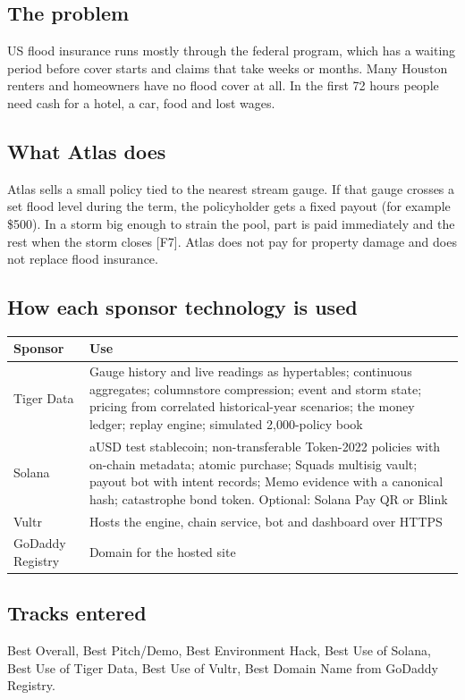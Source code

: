 \documentclass[11pt]{article}
\begin{document}
\subsection{The problem}
US flood insurance runs mostly through the federal program, which has a waiting period before cover starts and claims that take weeks or months. Many Houston renters and homeowners have no flood cover at all. In the first 72 hours people need cash for a hotel, a car, food and lost wages.

\subsection{What Atlas does}
Atlas sells a small policy tied to the nearest stream gauge. If that gauge crosses a set flood level during the term, the policyholder gets a fixed payout (for example \$500). In a storm big enough to strain the pool, part is paid immediately and the rest when the storm closes [F7]. Atlas does not pay for property damage and does not replace flood insurance.

\subsection{How each sponsor technology is used}
{\small
\begin{xltabular}{\linewidth}{@{}L{2.8cm} Y@{}}
\toprule
Sponsor & Use \\
\midrule
Tiger Data & Gauge history and live readings as hypertables; continuous aggregates; columnstore compression; event and storm state; pricing from correlated historical-year scenarios; the money ledger; replay engine; simulated 2,000-policy book \\
Solana & aUSD test stablecoin; non-transferable Token-2022 policies with on-chain metadata; atomic purchase; Squads multisig vault; payout bot with intent records; Memo evidence with a canonical hash; catastrophe bond token. Optional: Solana Pay QR or Blink \\
Vultr & Hosts the engine, chain service, bot and dashboard over HTTPS \\
GoDaddy Registry & Domain for the hosted site \\
\bottomrule
\end{xltabular}
}

\subsection{Tracks entered}
Best Overall, Best Pitch/Demo, Best Environment Hack, Best Use of Solana, Best Use of Tiger Data, Best Use of Vultr, Best Domain Name from GoDaddy Registry.
\end{document}
